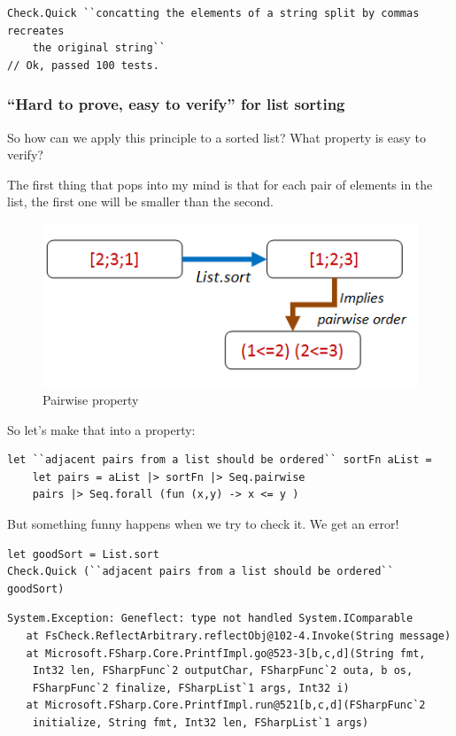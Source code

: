 \begin{verbatim}
Check.Quick ``concatting the elements of a string split by commas recreates 
    the original string`` 
// Ok, passed 100 tests.
\end{verbatim}

\subsubsection{``Hard to prove, easy to verify'' for list
sorting}
\label{hard-to-prove-easy-to-verify-for-list-sorting}

So how can we apply this principle to a sorted list? What property is
easy to verify?

The first thing that pops into my mind is that for each pair of elements
in the list, the first one will be smaller than the second.

\begin{figure}[htbp]
\centering
\includegraphics{pics/property_list_sort_pairwise.png}
\caption{Pairwise property}
\end{figure}

So let's make that into a property:

\begin{verbatim}
let ``adjacent pairs from a list should be ordered`` sortFn aList = 
	let pairs = aList |> sortFn |> Seq.pairwise
	pairs |> Seq.forall (fun (x,y) -> x <= y )
\end{verbatim}
But something funny happens when we try to check it. We get an error!

\begin{verbatim}
let goodSort = List.sort
Check.Quick (``adjacent pairs from a list should be ordered`` goodSort)
\end{verbatim}
\begin{verbatim}
System.Exception: Geneflect: type not handled System.IComparable
   at FsCheck.ReflectArbitrary.reflectObj@102-4.Invoke(String message)
   at Microsoft.FSharp.Core.PrintfImpl.go@523-3[b,c,d](String fmt, 
    Int32 len, FSharpFunc`2 outputChar, FSharpFunc`2 outa, b os, 
    FSharpFunc`2 finalize, FSharpList`1 args, Int32 i)
   at Microsoft.FSharp.Core.PrintfImpl.run@521[b,c,d](FSharpFunc`2 
    initialize, String fmt, Int32 len, FSharpList`1 args)
\end{verbatim}

